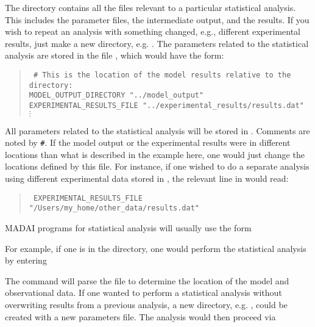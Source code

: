 The  directory contains all the files relevant to a particular statistical analysis. This includes the parameter files, the intermediate output, and the results. If you wish to repeat an analysis with something changed, e.g., different experimental results, just make a new directory, e.g. . The parameters related to the statistical analysis are stored in the file , which would have the form:
\vspace*{-8pt}\begin{quote}{\tt
	\# This is the location of the model results relative to the  directory:\\
	MODEL\_OUTPUT\_DIRECTORY "../model\_output"\\
    EXPERIMENTAL\_RESULTS\_FILE "../experimental\_results/results.dat"\\
	$\vdots$\\
	}
\end{quote}\vspace*{-8pt}
All parameters related to the statistical analysis will be stored in . Comments are noted by {\tt\#}. If the model output or the experimental results were in different locations than what is described in the example here, one would just change the locations defined by this file. For instance, if one wished to do a separate analysis using different experimental data stored in , the relevant line in  would read:
\begin{quote}{\tt
EXPERIMENTAL\_RESULTS\_FILE "/Users/my\_home/other\_data/results.dat"}
\end{quote}
MADAI programs for statistical analysis will usually use the form


For example, if one is in the  directory, one would perform the statistical analysis by entering


The command will parse the file  to determine the location of the model and observational data. If one wanted to perform a statistical analysis without overwriting results from a previous analysis, a new directory, e.g. , could be created with a new parameters file. The analysis would then proceed via\\

